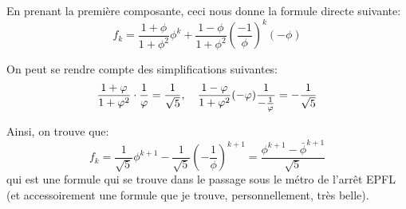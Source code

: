 \documentclass[a4paper]{article}
\begin{document}
{    En prenant la première composante, ceci nous donne la formule directe suivante: 
    \[f_k = \frac{1 + \phi}{1 + \phi^2} \phi^k + \frac{1 - \phi}{1 + \phi^2}\left(\frac{-1}{\phi}\right)^{k} \left(-\phi\right)\]
     
    On peut se rendre compte des simplifications suivantes: 
    \[\frac{1 + \phi}{1 + \phi^2} \cdot \frac{1}{\phi} = \frac{1}{\sqrt{5}}, \mathspace \frac{1 - \phi}{1 + \phi^2} \left(-\phi\right) \frac{1}{-\frac{1}{\phi}} = -\frac{1}{\sqrt{5}}\]
    
    Ainsi, on trouve que: 
    \[f_k = \frac{1}{\sqrt{5}} \phi^{k+1} - \frac{1}{\sqrt{5}} \left(-\frac{1}{\phi}\right)^{k+1} = \frac{\phi^{k+1} - \bar{\phi}^{k+1}}{\sqrt{5}}\]
    qui est une formule qui se trouve dans le passage sous le métro de l'arrêt EPFL (et accessoirement une formule que je trouve, personnellement, très belle).
}
\end{document}
